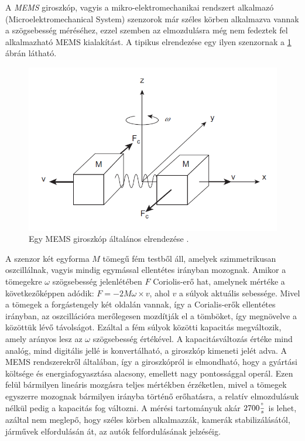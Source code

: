 A \textit{MEMS} giroszkóp, vagyis a mikro-elektromechanikai rendszert alkalmazó (Microelektromechanical System) szenzorok már széles körben alkalmazva vannak a szögsebesség méréséhez, ezzel szemben az elmozdulásra még nem fedeztek fel alkalmazható MEMS kialakítást. A tipikus elrendezése egy ilyen szenzornak a \ref{memsgyro} ábrán látható. 
\begin{figure}
	\centering
	\includegraphics[width=\columnwidth*7/10]{figures/memsgyro.png}
	\caption{Egy MEMS giroszkóp általános elrendezése \cite{Morris2016b}.}
	\label{memsgyro}
\end{figure}
A szenzor két egyforma $M$ tömegű fém testből áll, amelyek szimmetrikusan oszcillálnak, vagyis mindig egymással ellentétes irányban mozognak. Amikor a tömegekre $\omega$ szögsebesség jelenlétében $F$ Coriolis-erő hat, amelynek mértéke a következőképpen adódik: $F=-2M\omega\times v$, ahol $v$ a súlyok aktuális sebessége. Mivel a tömegek a forgástengely két oldalán vannak, így a Corialis-erők ellentétes irányban, az oszcillációra merőlegesen mozdítják el a tömböket, így megnövelve a közöttük lévő távolságot. Ezáltal a fém súlyok közötti kapacitás megváltozik, amely arányos lesz az $\omega$ szögsebesség értékével. A kapacitásváltozás értéke mind analóg, mind digitális jellé is konvertálható, a giroszkóp kimeneti jelét adva. A MEMS rendszerekről általában, így a giroszkópról is elmondható, hogy a gyártási költsége és energiafogyasztása alacsony, emellett nagy pontossággal operál. Ezen felül bármilyen lineáris mozgásra teljes mértékben érzéketlen, mivel a tömegek egyszerre mozognak bármilyen irányba történő erőhatásra, a relatív elmozdulásuk nélkül pedig a kapacitás fog változni. A mérési tartományuk akár $2700\frac{\degree}{s}$ is lehet, azáltal nem meglepő, hogy széles körben alkalmazzák, kamerák stabilizálásától, járművek elfordulásán át, az autók felfordulásának jelzéséig. 

